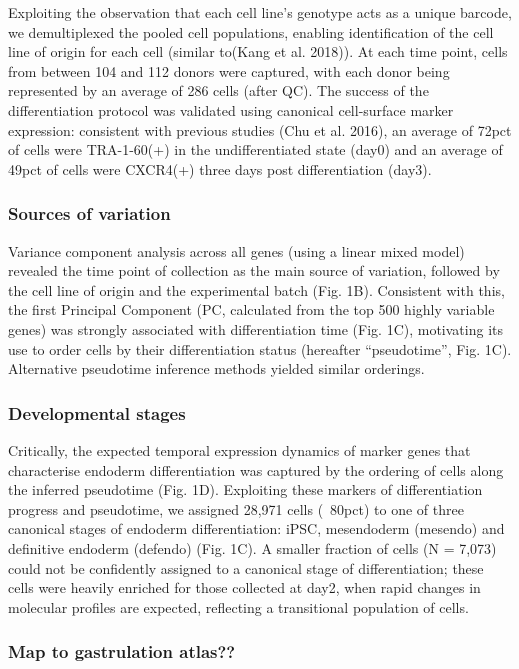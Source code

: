  Exploiting the observation that each cell line’s genotype acts as a unique barcode, we demultiplexed the pooled cell populations, enabling identification of the cell line of origin for each cell (similar to(Kang et al. 2018)). At each time point, cells from between 104 and 112 donors were captured, with each donor being represented by an average of 286 cells (after QC). The success of the differentiation protocol was validated using canonical cell-surface marker expression: consistent with previous studies (Chu et al. 2016), an average of 72pct of cells were TRA-1-60(+) in the undifferentiated state (day0) and an average of 49pct of cells were CXCR4(+) three days post differentiation (day3).

\subsubsection{Sources of variation} 

Variance component analysis across all genes (using a linear mixed model) revealed the time point of collection as the main source of variation, followed by the cell line of origin and the experimental batch (Fig. 1B). Consistent with this, the first Principal Component (PC, calculated from the top 500 highly variable genes) was strongly associated with differentiation time (Fig. 1C), motivating its use to order cells by their differentiation status (hereafter “pseudotime”, Fig. 1C). Alternative pseudotime inference methods yielded similar orderings.

\subsubsection{Developmental stages}
 
Critically, the expected temporal expression dynamics of marker genes that characterise endoderm differentiation was captured by the ordering of cells along the inferred pseudotime (Fig. 1D). Exploiting these markers of differentiation progress and pseudotime, we assigned 28,971 cells (~80pct) to one of three canonical stages of endoderm differentiation: iPSC, mesendoderm (mesendo) and definitive endoderm (defendo) (Fig. 1C). A smaller fraction of cells (N = 7,073) could not be confidently assigned to a canonical stage of differentiation; these cells were heavily enriched for those collected at day2, when rapid changes in molecular profiles are expected, reflecting a transitional population of cells.

\subsubsection{Map to gastrulation atlas??}



